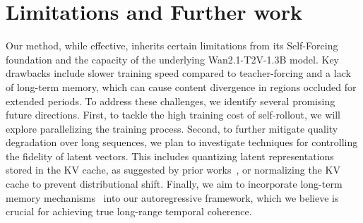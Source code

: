 \section{Limitations and Further work}
Our method, while effective, inherits certain limitations from its Self-Forcing foundation and the capacity of the underlying Wan2.1-T2V-1.3B model. Key drawbacks include slower training speed compared to teacher-forcing and a lack of long-term memory, which can cause content divergence in regions occluded for extended periods.
To address these challenges, we identify several promising future directions. First, to tackle the high training cost of self-rollout, we will explore parallelizing the training process. Second, to further mitigate quality degradation over long sequences, we plan to investigate techniques for controlling the fidelity of latent vectors. This includes quantizing latent representations stored in the KV cache, as suggested by prior works~\citep{zhang2025packing}, or normalizing the KV cache to prevent distributional shift. Finally, we aim to incorporate long-term memory mechanisms~\citep{li2025hunyuangamecrafthighdynamicinteractivegame,liu2025worldweaver} into our autoregressive framework, which we believe is crucial for achieving true long-range temporal coherence.